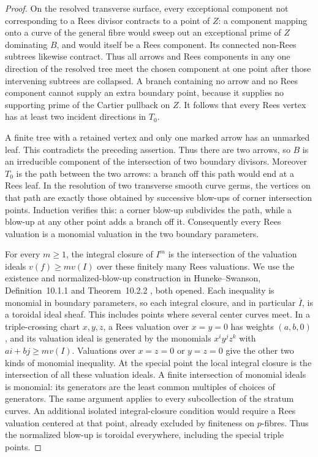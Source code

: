 \begin{proof}
On the resolved transverse surface, every exceptional component not corresponding to a Rees divisor contracts to a point of $Z$: a component mapping onto a curve of the general fibre would sweep out an exceptional prime of $Z$ dominating $B$, and would itself be a Rees component. Its connected non-Rees subtrees likewise contract. Thus all arrows and Rees components in any one direction of the resolved tree meet the chosen component at one point after those intervening subtrees are collapsed. A branch containing no arrow and no Rees component cannot supply an extra boundary point, because it supplies no supporting prime of the Cartier pullback on $Z$. It follows that every Rees vertex has at least two incident directions in $T_0$.

A finite tree with a retained vertex and only one marked arrow has an unmarked leaf. This contradicts the preceding assertion. Thus there are two arrows, so $B$ is an irreducible component of the intersection of two boundary divisors. Moreover $T_0$ is the path between the two arrows: a branch off this path would end at a Rees leaf. In the resolution of two transverse smooth curve germs, the vertices on that path are exactly those obtained by successive blow-ups of corner intersection points. Induction verifies this: a corner blow-up subdivides the path, while a blow-up at any other point adds a branch off it. Consequently every Rees valuation is a monomial valuation in the two boundary parameters.

For every $m\geq1$, the integral closure of $I^m$ is the intersection of the valuation ideals $v(f)\geq m v(I)$ over these finitely many Rees valuations. We use the existence and normalized-blow-up construction in Huneke--Swanson, Definition~10.1.1 and Theorem~10.2.2 \cite{HunekeSwanson2006}, both opened. Each inequality is monomial in boundary parameters, so each integral closure, and in particular $\overline I$, is a toroidal ideal sheaf. This includes points where several center curves meet. In a triple-crossing chart $x,y,z$, a Rees valuation over $x=y=0$ has weights $(a,b,0)$, and its valuation ideal is generated by the monomials $x^i y^j z^k$ with $ai+bj\geq m v(I)$. Valuations over $x=z=0$ or $y=z=0$ give the other two kinds of monomial inequality. At the special point the local integral closure is the intersection of all these valuation ideals. A finite intersection of monomial ideals is monomial: its generators are the least common multiples of choices of generators. The same argument applies to every subcollection of the stratum curves. An additional isolated integral-closure condition would require a Rees valuation centered at that point, already excluded by finiteness on $p$-fibres. Thus the normalized blow-up is toroidal everywhere, including the special triple points.


\end{proof}
